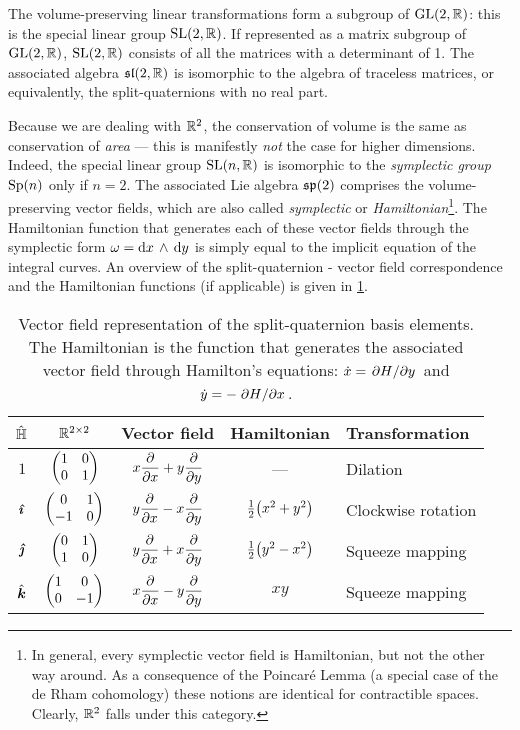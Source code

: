 The volume-preserving linear transformations form a subgroup of $\glgroup{2}{\real}$: this is the special linear group $\slgroup{2}{\real}$. If represented as a matrix subgroup of $\glgroup{2}{\real}$, $\slgroup{2}{\real}$ consists of all the matrices with a determinant of 1. The associated algebra $\slalg{2}{\real}$ is isomorphic to the algebra of traceless matrices, or equivalently, the split-quaternions with no real part.

Because we are dealing with $\real^2$, the conservation of volume is the same as conservation of \emph{area} --- this is manifestly \emph{not} the case for higher dimensions.  Indeed, the special linear group $\slgroup{n}{\real}$ is isomorphic to the \emph{symplectic group} $\spgroup{n}$ only if $n = 2$. The associated Lie algebra $\spalg{2}$ comprises the volume-preserving vector fields, which are also called \emph{symplectic} or \emph{Hamiltonian}\footnote{In general, every symplectic vector field is Hamiltonian, but not the other way around. As a consequence of the Poincaré Lemma (a special case of the de Rham cohomology) these notions are identical for contractible spaces. Clearly, $\real^2$ falls under this category.}. The Hamiltonian function that generates each of these vector fields through the symplectic form $\omega = \wedgep{\dd{x}}{\dd{y}}$ is simply equal to the implicit equation of the integral curves. An overview of the split-quaternion - vector field correspondence and the Hamiltonian functions (if applicable) is given in \cref{tab:basis_vf}.

\begin{table}[ht!]
    \centering
    \caption{Vector field representation of the split-quaternion basis elements. The Hamiltonian is the function that generates the associated vector field through Hamilton's equations: $\dot{x} = \pdv*{H}{y}$ and $\dot{y} = -\pdv*{H}{x}$.}
    \label{tab:basis_vf}
    \begin{tabular}{ccccl}
        \toprule
        $\spquaternions$ &  $ \real^{2\times 2} $ & \textbf{Vector field} & \textbf{Hamiltonian} & \textbf{Transformation} \\
        \midrule
        $1$ & $\mqty(1 & 0 \\ 0 & 1) $ & $\displaystyle x\pdv{}{x} + y\pdv{}{y} $ & --- & Dilation \\[0.4cm]
        $\quati$ & $\mqty(0 & 1 \\ -1 & 0) $ & $\displaystyle y\pdv{}{x} - x\pdv{}{y} $ & $ \tfrac{1}{2}\qty(x^2 + y^2) $ & Clockwise rotation \\[0.4cm]
        $\quatj$ & $\mqty(0 & 1 \\ 1 & 0) $ & $\displaystyle y\pdv{}{x} + x\pdv{}{y} $ & $ \tfrac{1}{2}\qty(y^2 - x^2) $ & Squeeze mapping \\[0.4cm]
        $\quatk$ & $\mqty(1 & 0 \\ 0 & -1) $ & $\displaystyle x\pdv{}{x}  -y\pdv{}{y} $ & $ xy $ & Squeeze mapping \\[0.4cm]
        \bottomrule
    \end{tabular}
\end{table}

